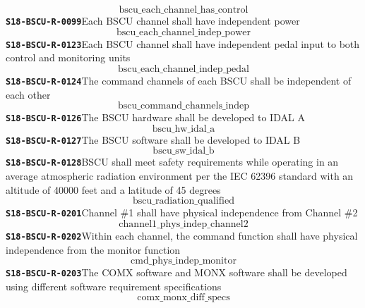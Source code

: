 \documentclass[11pt,a4paper]{article}
\begin{document}
\begin{dmath*}
\text{bscu\_each\_channel\_has\_control}
\end{dmath*}
\noindent\textbf{\texttt{S18-BSCU-R-0099}}\quad Each BSCU channel shall have independent power
\begin{dmath*}
\text{bscu\_each\_channel\_indep\_power}
\end{dmath*}
\noindent\textbf{\texttt{S18-BSCU-R-0123}}\quad Each BSCU channel shall have independent pedal input to both control and monitoring units
\begin{dmath*}
\text{bscu\_each\_channel\_indep\_pedal}
\end{dmath*}
\noindent\textbf{\texttt{S18-BSCU-R-0124}}\quad The command channels of each BSCU shall be independent of each other
\begin{dmath*}
\text{bscu\_command\_channels\_indep}
\end{dmath*}
\noindent\textbf{\texttt{S18-BSCU-R-0126}}\quad The BSCU hardware shall be developed to IDAL A
\begin{dmath*}
\text{bscu\_hw\_idal\_a}
\end{dmath*}
\noindent\textbf{\texttt{S18-BSCU-R-0127}}\quad The BSCU software shall be developed to IDAL B
\begin{dmath*}
\text{bscu\_sw\_idal\_b}
\end{dmath*}
\noindent\textbf{\texttt{S18-BSCU-R-0128}}\quad BSCU shall meet safety requirements while operating in an average atmospheric radiation environment per the IEC 62396 standard with an altitude of 40000 feet and a latitude of 45 degrees
\begin{dmath*}
\text{bscu\_radiation\_qualified}
\end{dmath*}
\noindent\textbf{\texttt{S18-BSCU-R-0201}}\quad Channel \#1 shall have physical independence from Channel \#2
\begin{dmath*}
\text{channel1\_phys\_indep\_channel2}
\end{dmath*}
\noindent\textbf{\texttt{S18-BSCU-R-0202}}\quad Within each channel, the command function shall have physical independence from the monitor function
\begin{dmath*}
\text{cmd\_phys\_indep\_monitor}
\end{dmath*}
\noindent\textbf{\texttt{S18-BSCU-R-0203}}\quad The COMX software and MONX software shall be developed using different software requirement specifications
\begin{dmath*}
\text{comx\_monx\_diff\_specs}
\end{dmath*}
\end{document}
